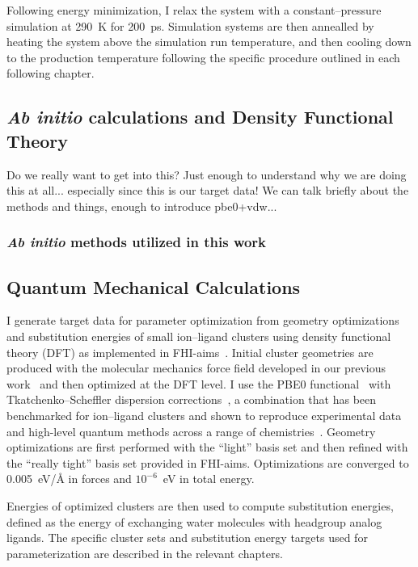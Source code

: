 Following energy minimization, I relax the system with a constant--pressure
simulation at 290~K for 200~ps. Simulation systems are then annealled by heating the system above the
simulation run temperature, and then cooling down to the production temperature following the
specific procedure outlined in each following chapter.

\subsection{\emph{Ab initio} calculations and Density Functional Theory}
Do we really want to get into this? Just enough to understand why we are doing this at all... especially since this is our target data! We
can talk briefly about the methods and things, enough to introduce pbe0+vdw...
\subsubsection{\emph{Ab initio} methods utilized in this work}
\subsection{Quantum Mechanical Calculations}
I generate target data for parameter optimization from geometry
optimizations and substitution energies of small ion–ligand clusters
using density functional theory (DFT) as implemented in
FHI-aims~\cite{fhiaims}. Initial cluster geometries are produced with
the molecular mechanics force field developed in our previous
work~\cite{kruczek:2017,saunders:2019} and then optimized at the DFT
level. I use the PBE0 functional~\cite{perdew:1996:generalized,adamo:1999:toward}
with Tkatchenko–Scheffler dispersion corrections~\cite{tkatchenko:2009},
a combination that has been benchmarked for ion–ligand clusters and shown
to reproduce experimental data and high-level quantum methods across a
range of chemistries~\cite{wineman:2019,wineman:2020:transferable,wineman:2020:improved}.
Geometry optimizations are first performed with the ``light'' basis set
and then refined with the ``really tight'' basis set provided in
FHI-aims. Optimizations are converged to 0.005~eV/\AA{} in forces and
$10^{-6}$~eV in total energy.  

Energies of optimized clusters are then used to compute substitution
energies, defined as the energy of exchanging water molecules
with headgroup analog ligands. The specific cluster sets and substitution
energy targets used for parameterization are described in the relevant
chapters.

